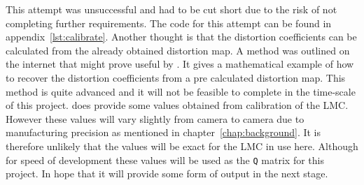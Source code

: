 \documentclass[11pt,oneside]{report}
\newcommand\code[1]{\texttt{#1}}
\begin{document}
			This attempt was unsuccessful and had to be cut short due to the risk of not completing further requirements.
			The code for this attempt can be found in appendix~\ref{lst:calibrate}.
			Another thought is that the distortion coefficients can be calculated from the already obtained distortion map.
			A method was outlined on the internet that might prove useful by .
			It gives a mathematical example of how to recover the distortion coefficients from a pre calculated distortion map.
			This method is quite advanced and it will not be feasible to complete in the time-scale of this project.
			 does provide some values obtained from calibration of the LMC.
			However these values will vary slightly from camera to camera due to manufacturing precision as mentioned in chapter~\ref{chap:background}.
			It is therefore unlikely that the values will be exact for the LMC in use here.
			Although for speed of development these values will be used as the \code{Q} matrix for this project.
			In hope that it will provide some form of output in the next stage.
\end{document}
